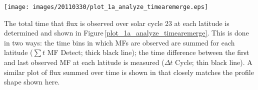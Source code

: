 \documentclass[namedreferences]{solarphysics}
\begin{document}
\begin{article}


\begin{figure*}[!t]
\texttt{[image: images/20110330/plot\_1a\_analyze\_timearemerge.eps]}
\caption{The amount of time that flux within the black outline shown in the bottom panel of Figure\,\ref{plot_1_analyze_fluxbflydiag} is observed to emerge at each latitude. This is measured both by counting the bins in which MFs are observed at each latitude bin ($\sum t$ MF Detect; thick black line) and by measuring the time difference between the first and last observed MF at each latitude bin of cycle 23 ($\Delta t$ Cycle; thin black line). For comparison, $\sum \Phi_{\mathrm{TOT}}$ is over-plotted; this is the flux (averaged over each time bin) summed over all times at each latitude bin (gray line).}\label{plot_1a_analyze_timearemerge}
\end{figure*}


The total time that flux is observed over solar cycle 23 at each latitude is determined and shown in  Figure\,\ref{plot_1a_analyze_timearemerge}. This is done in two ways: the time bins in which MFs are observed are summed for each latitude ($\sum t$ MF Detect; thick black line); the time difference between the first and last observed MF at each latitude is measured ($\Delta t$ Cycle; thin black line). A similar plot of flux summed over time is shown in \citet{jin:2012} that closely matches the profile shape shown here. %



\end{article}
\end{document}
